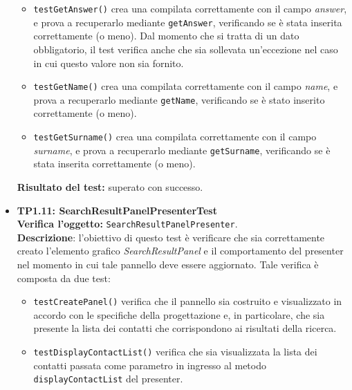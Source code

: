 \begin{itemize}
\begin{itemize}
\item \texttt{testGetAnswer()} crea una  compilata correttamente con il campo \textit{answer}, e prova a recuperarlo mediante \texttt{getAnswer}, verificando se è stata inserita correttamente (o meno). Dal momento che si tratta di un dato obbligatorio, il test verifica anche che sia sollevata un'eccezione nel caso in cui questo valore non sia fornito.
\item \texttt{testGetName()}  crea una  compilata correttamente con il campo \textit{name}, e prova a recuperarlo mediante \texttt{getName}, verificando se è stato inserito correttamente (o meno).
\item \texttt{testGetSurname()}  crea una  compilata correttamente con il campo \textit{surname}, e prova a recuperarlo mediante \texttt{getSurname}, verificando se è stata inserita correttamente (o meno).

\end{itemize}
\textbf{Risultato del test:} superato con successo.

\item \textbf{TP1.11: SearchResultPanelPresenterTest}\\
\textbf{Verifica l'oggetto:} \texttt{SearchResultPanelPresenter}.\\
\textbf{Descrizione}: l'obiettivo di questo test è verificare che sia correttamente creato l'elemento grafico \textit{SearchResultPanel} e il comportamento del presenter nel momento in cui tale pannello deve essere aggiornato. Tale verifica è composta da due test:
\begin{itemize}
\item \texttt{testCreatePanel()} verifica che il pannello sia costruito e visualizzato in accordo con le specifiche della progettazione e, in particolare, che sia presente la lista dei contatti che corrispondono ai risultati della ricerca.
\item \texttt{testDisplayContactList()} verifica che sia visualizzata la lista dei contatti passata come parametro in ingresso al metodo \texttt{displayContactList} del presenter.
\end{itemize}


\end{itemize}
